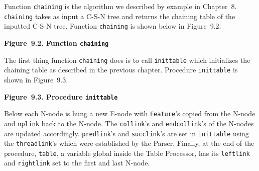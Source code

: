 \documentclass{article}
\begin{document}
Function \texttt{chaining} is the algorithm we described by
example in Chapter~8. \texttt{chaining} takes as input a C-S-N
tree and returns the chaining table of the inputted C-S-N tree.
Function \texttt{chaining} is shown below in Figure~9.2.

\bigbreak
\begin{minipage}{\textwidth}
\vbox{}
\bigbreak
{}
\textbf{Figure~9.2. Function \texttt{chaining}}
\end{minipage}
\bigbreak

The first thing function \texttt{chaining} does is to call
\texttt{inittable} which initializes the chaining table as
described in the previous chapter. Procedure \texttt{inittable}
is shown in Figure~9.3.

\bigbreak
\begin{minipage}{\textwidth}
\vbox{}
\bigbreak
{}
\textbf{Figure~9.3. Procedure \texttt{inittable}}
\end{minipage}
\bigbreak

Below each N-node is hung a new E-node with \texttt{Feature}'s
copied from the N-node and \texttt{nplink} back to the
N-node. The \texttt{collink}'s and \texttt{endcollink}'s of the
N-nodes are updated accordingly. \texttt{predlink}'s and
\texttt{succlink}'s are set in \texttt{inittable} using the
\texttt{threadlink}'s which were established by the Parser.
Finally, at the end of the procedure, \texttt{table}, a variable
global inside the Table Processor, has its \texttt{leftlink} and
\texttt{rightlink} set to the first and last N-node.
\end{document}

